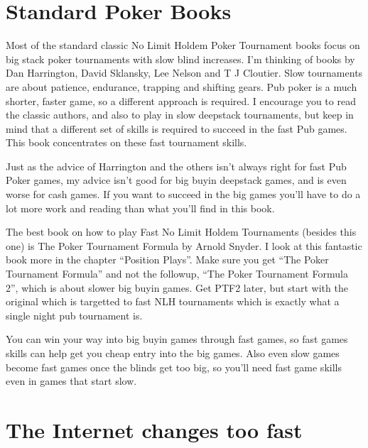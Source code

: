 \section{Standard Poker Books}


Most of the standard classic No Limit Holdem Poker Tournament books
focus on big stack poker tournaments with slow blind increases.
I'm thinking of books by Dan Harrington, David Sklansky, Lee Nelson
and T J Cloutier. Slow tournaments are about patience, endurance,
trapping and shifting gears. Pub poker is a much
shorter, faster game, so a different approach
is required. I encourage you to read the
classic authors, and also to play in slow deepstack tournaments,
but keep in mind that a different set of skills is required to succeed
in the fast Pub games. This book concentrates on these fast
tournament skills.

Just as the advice of Harrington and the others isn't always right
for fast Pub Poker games, my advice isn't good
for big buyin deepstack games, and is even worse for
cash games. If you want to succeed in the big games you'll have to do a
lot more work and reading than what you'll find in this book.

The best book on how to play Fast No Limit Holdem Tournaments
(besides this one) is The Poker Tournament Formula by Arnold Snyder.
I look at this fantastic book more in the chapter ``Position Plays''.
Make sure you get ``The Poker Tournament Formula'' and not the followup,
``The Poker Tournament Formula 2'', which is about slower big buyin games.
Get PTF2 later, but start with the original which is targetted to fast
NLH tournaments which is exactly what a single night pub tournament is.

You can win your way into big buyin games through fast games,
so fast games skills can help get you cheap entry into the big games.
Also even slow games become fast games once the blinds get too big,
so you'll need fast game skills even in games that start slow.

\section{The Internet changes too fast}

